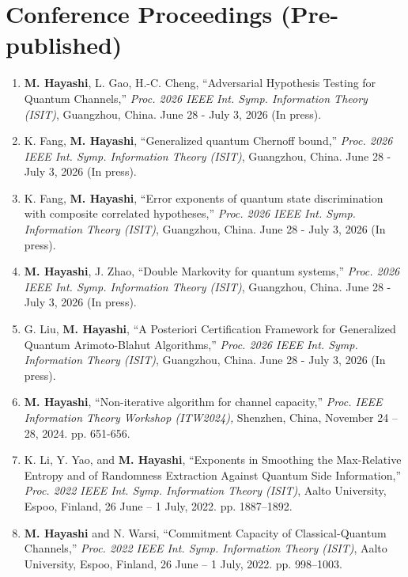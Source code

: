 \documentclass[a4paper,12pt,oneside]{article}
\begin{document}
\section{Conference Proceedings (Pre-published)}
\begin{enumerate}

\item
\textbf{M. Hayashi}, L. Gao, H.-C. Cheng,
``Adversarial Hypothesis Testing for Quantum Channels,''
{\em Proc. 2026 IEEE Int. Symp. Information Theory (ISIT)}, 
Guangzhou, China.
June 28 - July 3, 2026 (In press).

\item
K. Fang, \textbf{M. Hayashi}, 
``Generalized quantum Chernoff bound,''
{\em Proc. 2026 IEEE Int. Symp. Information Theory (ISIT)}, 
Guangzhou, China.
June 28 - July 3, 2026 (In press).

\item
K. Fang, \textbf{M. Hayashi}, 
``Error exponents of quantum state discrimination with composite correlated hypotheses,''
{\em Proc. 2026 IEEE Int. Symp. Information Theory (ISIT)}, 
Guangzhou, China.
June 28 - July 3, 2026 (In press).

\item
\textbf{M. Hayashi}, J. Zhao,
``Double Markovity for quantum systems,''
{\em Proc. 2026 IEEE Int. Symp. Information Theory (ISIT)}, 
Guangzhou, China.
June 28 - July 3, 2026 (In press).

\item
G. Liu, \textbf{M. Hayashi}, 
``A Posteriori Certification Framework for Generalized Quantum Arimoto-Blahut Algorithms,''
{\em Proc. 2026 IEEE Int. Symp. Information Theory (ISIT)}, 
Guangzhou, China.
June 28 - July 3, 2026 (In press).

	\item
	\textbf{M. Hayashi}, 
	``Non-iterative algorithm for channel capacity,''
	{\em Proc. IEEE Information Theory Workshop (ITW2024),} 
	Shenzhen, China, November 24 -- 28, 2024. 
	pp. 651-656.
	
    \item
    K. Li, Y. Yao, and \textbf{M. Hayashi}, 
    ``Exponents in Smoothing the Max-Relative Entropy and of Randomness Extraction Against Quantum Side Information,''
    {\em Proc. 2022 IEEE Int. Symp. Information Theory (ISIT)}, 
    Aalto University, Espoo, Finland, 26 June – 1 July, 2022. pp. 1887--1892.
    
    \item
    \textbf{M. Hayashi} and N. Warsi, 
    ``Commitment Capacity of Classical-Quantum Channels,''
    {\em Proc. 2022 IEEE Int. Symp. Information Theory (ISIT)}, 
    Aalto University, Espoo, Finland, 26 June – 1 July, 2022. pp. 998–1003.


\end{enumerate}
\end{document}
